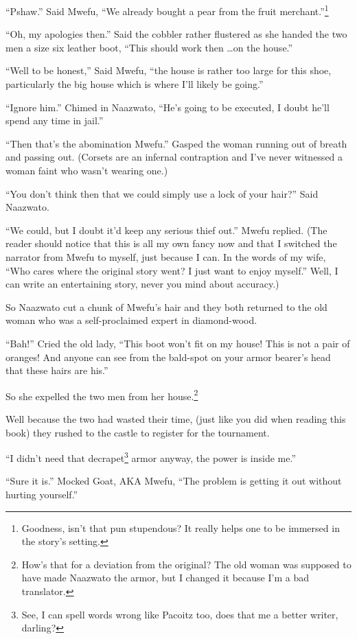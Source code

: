 ``Pshaw.'' Said Mwefu, ``We already bought a pear from the fruit merchant.''\footnote{Goodness, isn't that pun stupendous? It really helps one to be immersed in the story's setting.}

``Oh, my apologies then.'' Said the cobbler rather flustered as she handed the two men a size six leather boot, ``This should work then \ldots on the house.''

``Well to be honest,'' Said Mwefu, ``the house is rather too large for this shoe, particularly the big house which is where I'll likely be going.''

``Ignore him.'' Chimed in Naazwato, ``He's going to be executed, I doubt he'll spend any time in jail.''

``Then that's the abomination Mwefu.'' Gasped the woman running out of breath and passing out. (Corsets are an infernal contraption and I've never witnessed a woman faint who wasn't wearing one.)

``You don't think then that we could simply use a lock of your hair?'' Said Naazwato.

``We could, but I doubt it'd keep any serious thief out.'' Mwefu replied. (The reader should notice that this is all my own fancy now and that I switched the narrator from Mwefu to myself, just because I can. In the words of my wife, ``Who cares where the original story went? I just want to enjoy myself.'' Well, I can write an entertaining story, never you mind about accuracy.)

So Naazwato cut a chunk of Mwefu's hair and they both returned to the old woman who was a self-proclaimed expert in diamond-wood.

``Bah!'' Cried the old lady, ``This boot won't fit on my house! This is not a pair of oranges! And anyone can see from the bald-spot on your armor bearer's head that these hairs are his.''

So she expelled the two men from her house.\footnote{How's that for a deviation from the original? The old woman was supposed to have made Naazwato the armor, but I changed it because I'm a bad translator.}

Well because the two had wasted their time, (just like you did when reading this book) they rushed to the castle to register for the tournament.

``I didn't need that decrapet\footnote{See, I can spell words wrong like Pacoitz too, does that me a better writer, darling?} armor anyway, the power is inside me.''

``Sure it is.'' Mocked Goat, AKA Mwefu, ``The problem is getting it out without hurting yourself.''

